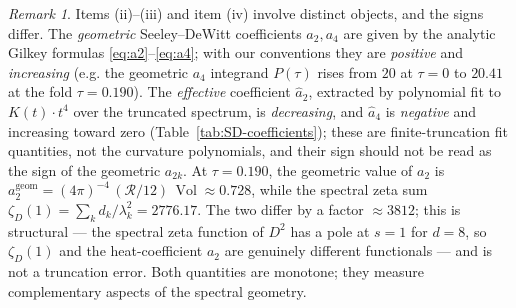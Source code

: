 \documentclass[12pt]{article}
\theoremstyle{definition}
\theoremstyle{remark}
\newtheorem{remark}[theorem]{Remark}
\DeclareMathOperator{\Vol}{Vol}
\begin{document}
\begin{remark}\label{rem:effective-coefficients}
Items (ii)--(iii) and item (iv) involve distinct objects, and the
signs differ.  The \emph{geometric} Seeley--DeWitt coefficients
$a_2, a_4$ are given by the analytic Gilkey formulas
\eqref{eq:a2}--\eqref{eq:a4}; with our conventions they are
\emph{positive} and \emph{increasing} (e.g. the geometric $a_4$
integrand $P(\tau)$ rises from $20$ at $\tau=0$ to $20.41$ at the fold
$\tau=0.190$).  The \emph{effective} coefficient $\hat{a}_2$,
extracted by polynomial fit to $K(t)\cdot t^4$ over the truncated
spectrum, is \emph{decreasing}, and $\hat{a}_4$ is \emph{negative}
and increasing toward zero (Table~\ref{tab:SD-coefficients}); these
are finite-truncation fit quantities, not the curvature polynomials,
and their sign should not be read as the sign of the geometric
$a_{2k}$.  At $\tau = 0.190$, the geometric value of $a_2$ is
$a_2^{\mathrm{geom}} = (4\pi)^{-4}\,(\mathcal{R}/12)\,\Vol \approx 0.728$,
while the spectral zeta sum $\zeta_D(1) = \sum_k d_k/\lambda_k^2 =
2776.17$.  The two differ by a factor $\approx 3812$; this is
structural --- the spectral zeta function of $D^2$ has a pole at
$s = 1$ for $d = 8$, so $\zeta_D(1)$ and the heat-coefficient $a_2$
are genuinely different functionals --- and is not a truncation error.
Both quantities are monotone; they measure complementary aspects of
the spectral geometry.
\end{remark}
\end{document}
